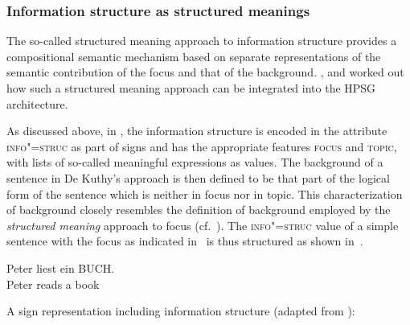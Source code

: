 \documentclass[output=paper,biblatex,babelshorthands,newtxmath,draftmode,colorlinks,citecolor=brown]{langscibook}
\begin{document}
\subsubsection{Information structure as structured meanings \citep{deKuthy2002a}}
\label{sec:struc-meaning}

\largerpage[2]
The so-called structured meaning approach to information structure
\citep{Stechow81a-u,Jacobs83a,Krifka92a-u} provides a
compositional semantic mechanism based on separate representations of
the semantic contribution of the focus and that of the
background. \citet{deKuthy2002a}, \citet{dKM2003a} and
\citet{Webelhuth2007a-u} worked out how such a structured meaning
approach can be integrated into the HPSG architecture.

As discussed above, in , the information structure
is encoded in the attribute \textsc{info"=struc} as part of signs and
has the appropriate features \textsc{focus} and \textsc{topic}, with
lists of so-called meaningful expressions as values. The background of
a sentence in De Kuthy's approach is then defined to be that part of
the logical form of the sentence which is neither in focus nor in
topic.  This characterization of background closely resembles the
definition of background employed by the \textit{structured meaning}
approach to focus (cf.\ \citealt{Krifka92a-u}).  The
\textsc{info"=struc} value of a simple sentence with the focus as
indicated in~ is thus structured as shown
in~.
\begin{exe}
  \ex\label{ex:peter} \gll Peter {\LF}liest ein BUCH{\RF}.\\
           Peter {\hphantom{\LF}}reads a book\\
\end{exe}
\ea
 A sign representation including information structure (adapted from \citealp[163]{deKuthy2002a}):
\end{document}
